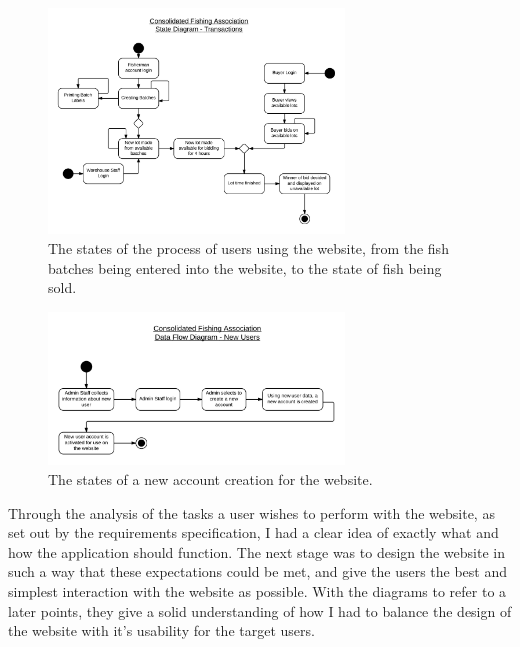 \documentclass{article}
\begin{document}
\begin{figure}[H]
	\centering
	\includegraphics[width=0.7\textwidth]{img/TA-SD-Batches.png}
	\caption{The states of the process of users using the website, from the fish batches being entered into the website, to the state of fish being sold.}
\end{figure}

\begin{figure}[H]
	\centering
	\includegraphics[width=0.7\textwidth]{img/TA-SD-Users.png}
	\caption{The states of a new account creation for the website.}
\end{figure}

Through the analysis of the tasks a user wishes to perform with the website, as set out by the requirements specification, I had a clear idea of exactly what and how the application should function. The next stage was to design the website in such a way that these expectations could be met, and give the users the best and simplest interaction with the website as possible. With the diagrams to refer to a later points, they give a solid understanding of how I had to balance the design of the website with it's usability for the target users.

\end{document}
